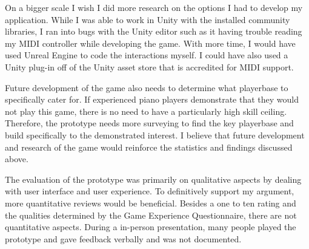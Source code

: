 \documentclass[10pt,twocolumn]{article}
\begin{document}
On a bigger scale I wish I did more research on the options I had to develop my application. While I was able to work in Unity with the installed community libraries, I ran into bugs with the Unity editor such as it having trouble reading my MIDI controller while developing the game. With more time, I would have used Unreal Engine to code the interactions myself. I could have also used a Unity plug-in off of the Unity asset store that is accredited for MIDI support. 

Future development of the game also needs to determine what playerbase to specifically cater for. If experienced piano players demonstrate that they would not play this game, there is no need to have a particularly high skill ceiling. Therefore, the prototype needs more surveying to find the key playerbase and build specifically to the demonstrated interest. I believe that future development and research of the game would reinforce the statistics and findings discussed above.

The evaluation of the prototype was primarily on qualitative aspects by dealing with user interface and user experience. To definitively support my argument, more quantitative reviews would be beneficial. Besides a one to ten rating and the qualities determined by the Game Experience Questionnaire, there are not quantitative aspects. During a in-person presentation, many people played the prototype and gave feedback verbally and was not documented. 
\end{document}
